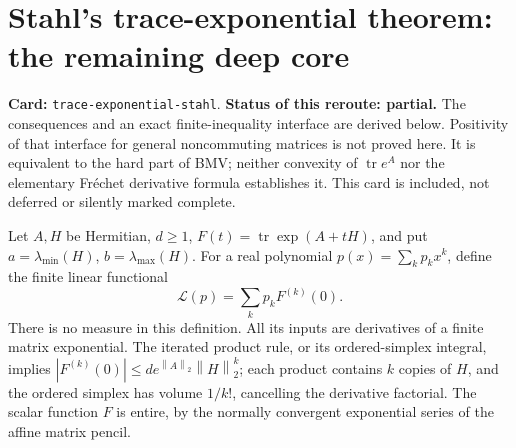 \documentclass[11pt,a4paper]{article}
\newcommand{\norm}[1]{\left\lVert#1\right\rVert}
\DeclareMathOperator{\tr}{tr}
\DeclareRobustCommand{\code}[1]{{\footnotesize\urlstyle{tt}\nolinkurl{#1}}}
\begin{document}
\section{Stahl's trace-exponential theorem: the remaining deep core}
\label{route:trace-exponential-stahl}
\textbf{Card:} \code{trace-exponential-stahl}.
\textbf{Status of this reroute: partial.} The consequences and an exact
finite-inequality interface are derived below. Positivity of that interface
for general noncommuting matrices is not proved here. It is equivalent to
the hard part of BMV; neither convexity of $\tr e^A$ nor the elementary
Fr\'echet derivative formula establishes it. This card is included, not
deferred or silently marked complete.

Let $A,H$ be Hermitian, $d\ge1$, $F(t)=\tr\exp(A+tH)$, and put
$a=\lambda_{\min}(H)$, $b=\lambda_{\max}(H)$. For a real polynomial
$p(x)=\sum_kp_kx^k$, define the finite linear functional
\[
 \mathcal L(p)=\sum_kp_kF^{(k)}(0).
\]
There is no measure in this definition. All its inputs are derivatives
of a finite matrix exponential. The iterated product rule, or its
ordered-simplex integral, implies
$|F^{(k)}(0)|\le d e^{\norm A_2}\norm H_2^k$; each product contains $k$
copies of $H$, and the ordered simplex has volume $1/k!$, cancelling the
derivative factorial. The scalar function $F$ is entire, by the normally
convergent exponential series of the affine matrix pencil.
\end{document}
